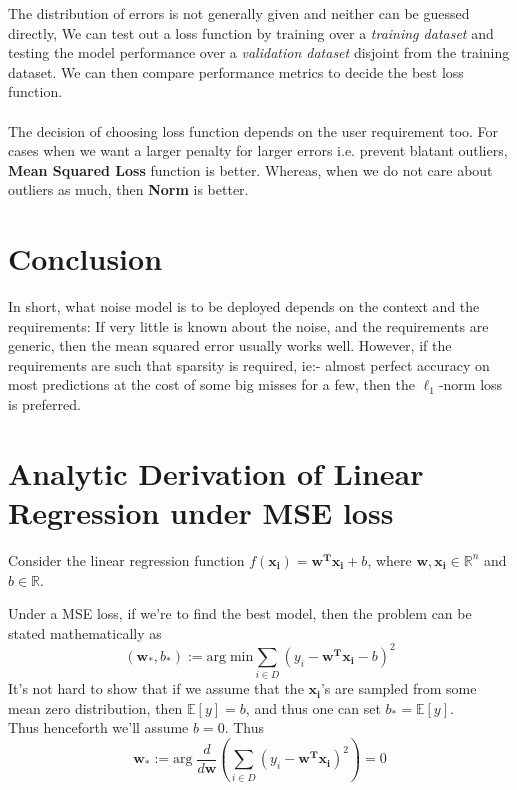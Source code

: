 \documentclass[12pt]{article}
\begin{document}
The distribution of errors is not generally given and neither can be guessed directly, We can test out a loss function by training over a \emph{training dataset} and testing the model performance over a \emph{validation dataset} disjoint from the training dataset. We can then compare performance metrics to decide the best loss function. \\ \\
The decision of choosing loss function depends on the user requirement too.
For cases when we want a larger penalty for larger errors i.e. prevent blatant outliers, \textbf{Mean Squared Loss} function is better. Whereas, when we do not care about outliers as much, then \textbf{ Norm} is better.

\section{Conclusion}
In short, what noise model is to be deployed depends on the context and the requirements: If very little is known about the noise, and the requirements are generic, then the mean squared error usually works well. However, if the requirements are such that sparsity is required, ie:- almost perfect accuracy on most predictions at the cost of some big misses for a few, then the $\ell_1$-norm loss is preferred.

\section*{Analytic Derivation of Linear Regression under MSE loss}
Consider the linear regression function $f(\boldsymbol{x_i}) = \boldsymbol{w^Tx_i} + b$, where $\boldsymbol{w}, \boldsymbol{x_i}\in\mathbb{R}^n$ and $b\in\mathbb{R}$. 

\noindent Under a MSE loss, if we're to find the best model, then the problem can be stated mathematically as 
$$(\boldsymbol{w}_*, b_*) := \mathrm{arg}\;\mathrm{min} \sum_{i\in D}(y_i - \boldsymbol{w^Tx_i} - b)^2$$
It's not hard to show that if we assume that the $\boldsymbol{x_i}$'s are sampled from some mean zero distribution, then $\mathbb{E}[y] = b$, and thus one can set $b_* = \mathbb{E}[y]$.\\
Thus henceforth we'll assume $b = 0$. Thus
$$\boldsymbol{w}_* := \mathrm{arg}\;\frac{d}{d\boldsymbol{w}}\left(\sum_{i \in D} (y_i-\boldsymbol{w^Tx_i})^2\right)  = 0$$
\end{document}
